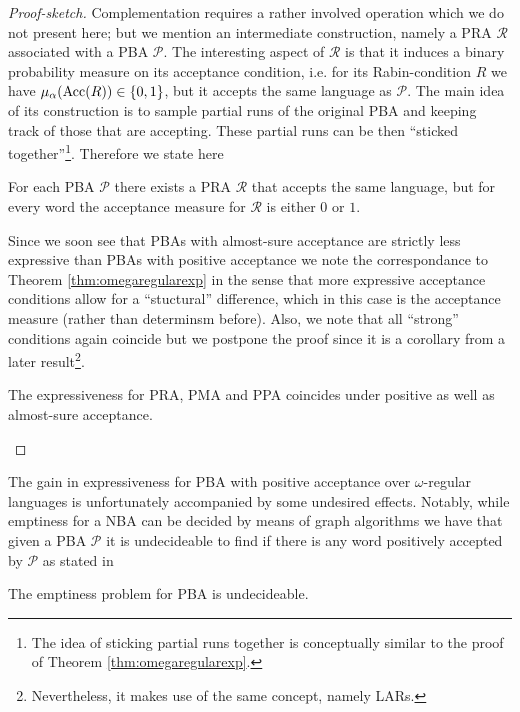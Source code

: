 \begin{proof}[Proof-sketch]
  Complementation requires a rather involved operation which we do not present 
  here; but we mention an intermediate construction, namely a \ac{PRA} 
  $\mathcal{R}$ associated with a \ac{PBA} $\mathcal{P}$. The 
  interesting aspect of $\mathcal{R}$ is that it induces a binary probability 
  measure on its acceptance condition, i.e. for its Rabin-condition $R$ we have
  $\mu_{\alpha}(\operatorname{Acc}(R))\in\left\{0,1\right\}$, but it accepts the same language as
  $\mathcal{P}$. The main idea of its construction is to sample partial runs of 
  the original \ac{PBA} and keeping track of those that are accepting. These 
  partial runs can be then \enquote{sticked together}\footnote{The idea of 
  sticking partial runs together is conceptually similar to the proof of 
  Theorem \ref{thm:omegaregularexp}.}. Therefore we state here
  \begin{theorem}
    \cite[Theorem 4.3.2]{Groesser}
    For each \ac{PBA} $\mathcal{P}$ there exists a \ac{PRA} $\mathcal{R}$ that 
    accepts the same language, but for every word the acceptance measure for
    $\mathcal{R}$ is either $0$ or $1$.
    \label{thm:pbatopra}
  \end{theorem}
  Since we soon see that \acp{PBA} with almost-sure acceptance are strictly
  less expressive than \acp{PBA} with positive acceptance we note the 
  correspondance to Theorem \ref{thm:omegaregularexp} in the
  sense that more expressive acceptance conditions allow for a 
  \enquote{stuctural} difference, which in this case is the acceptance measure
  (rather than determinsm before). Also, we note that all \enquote{strong} 
  conditions again coincide but we postpone the proof since it is a corollary 
  from a later result\footnote{
    Nevertheless, it makes use of the same concept, namely \acp{LAR}.
  }.
  \begin{theorem}
    The expressiveness for \ac{PRA}, \ac{PMA} and \ac{PPA} coincides under
    positive as well as almost-sure acceptance.
    \label{thm:probautoequiv}
  \end{theorem}
\end{proof}
The gain in expressiveness for \ac{PBA} with positive acceptance over 
$\omega$-regular languages is unfortunately accompanied by some undesired 
effects. Notably, while emptiness for a \ac{NBA} can be decided by means of 
graph algorithms we have that given a \ac{PBA} $\mathcal{P}$ it is undecideable 
to find if there is any word positively accepted by $\mathcal{P}$ as stated in
\begin{theorem}
  \cite[Theorem 2]{DecProblemsForProbAuto}
  The emptiness problem for \ac{PBA} is undecideable.
  \label{thm:emptinesspospba}
\end{theorem}
